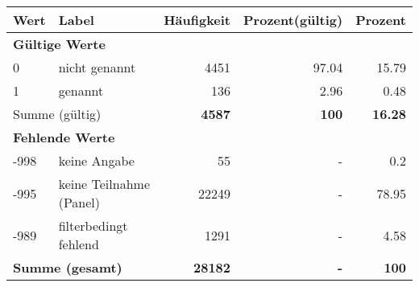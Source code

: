      \begin{longtable}{lXrrr}
     \toprule
     \textbf{Wert} & \textbf{Label} & \textbf{Häufigkeit} & \textbf{Prozent(gültig)} & \textbf{Prozent} \\
     \endhead
     \midrule
     \multicolumn{5}{l}{\textbf{Gültige Werte}}\\

     0 &
     \multicolumn{1}{X}{ nicht genannt   } &


       \num{4451} &
       \num[round-mode=places,round-precision=2]{97,04} &
         \num[round-mode=places,round-precision=2]{15,79} \\

     1 &
     \multicolumn{1}{X}{ genannt   } &


       \num{136} &
       \num[round-mode=places,round-precision=2]{2,96} &
         \num[round-mode=places,round-precision=2]{0,48} \\
     \midrule
     \multicolumn{2}{l}{Summe (gültig)} &
       \textbf{\num{4587}} &
     \textbf{100} &
       \textbf{\num[round-mode=places,round-precision=2]{16,28}} \\
     \multicolumn{5}{l}{\textbf{Fehlende Werte}}\\
       -998 &
       keine Angabe &
         \num{55} &
        - &
         \num[round-mode=places,round-precision=2]{0,2} \\
       -995 &
       keine Teilnahme (Panel) &
         \num{22249} &
        - &
         \num[round-mode=places,round-precision=2]{78,95} \\
       -989 &
       filterbedingt fehlend &
         \num{1291} &
        - &
         \num[round-mode=places,round-precision=2]{4,58} \\
     \midrule
     \multicolumn{2}{l}{\textbf{Summe (gesamt)}} &
          \textbf{\num{28182}} &
        \textbf{-} &
        \textbf{100} \\
     \bottomrule
     \end{longtable}
     
